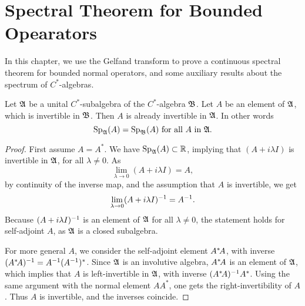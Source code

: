 
\section{Spectral Theorem for Bounded Opearators}
In this chapter, we use the Gelfand transform to prove a continuous
spectral theorem for bounded normal operators, and some auxiliary results
about the spectrum of $C^*$-algebras.
\begin{prop} \label{specinvariant}
 Let $\mathfrak{A}$ be a unital $C^*$-subalgebra of the $C^*$-algebra
 $\mathfrak{B}$. 
 Let $A$ be an element of $\mathfrak{A}$, which is invertible in $\mathfrak{B}$.
 Then $A$ is already invertible in $\mathfrak{A}$. In other words 
\[
   \operatorname{Sp}_{\mathfrak{A}}(A) = \operatorname{Sp}_{\mathfrak{B}}(A) \text{ for all } A \text{ in } \mathfrak{A}.
\]

\end{prop}
\begin{proof}
 First assume $A = A^* $. We have $\operatorname{Sp}_{\mathfrak{A}}(A) \subset \mathbb{R}$, implying that
  $(A + i \lambda I)$  is invertible in  $\mathfrak{A}$, for all $\lambda \neq 0$.
  As 
 \[
  \lim_{\lambda \to 0} (A + i \lambda I) = A,
 \]
 by continuity of the inverse map, and the assumption that $A$ is invertible,
 we get
 \[
  \lim_{\lambda \to 0} (A + i \lambda I) ^{-1} =A ^{-1}.
 \]
Because $ (A + i \lambda I)^{-1}$ is an element of $\mathfrak{A}$ for all $\lambda \neq 0$, 
the statement  holds for self-adjoint $A$, as $\mathfrak{A}$ is a closed subalgebra. 

For more general $A$, we consider the self-adjoint element
$A^{*} \! A$, with inverse  $(A^{*} \! A)^{-1} = A^{-1} (A^{-1})^*$. 
Since $\mathfrak{A}$ is an involutive algebra, $A^{*} \! A$ is an element of $\mathfrak{A}$, which implies that
$A$ is left-invertible in $\mathfrak{A}$, with inverse $(A^{*} \! A)^{-1} A^*$.
Using the same argument with the normal element $AA^*$, one gets the
right-invertibility of $A$. Thus $A$ is invertible, and the
inverses coincide.
\end{proof}

